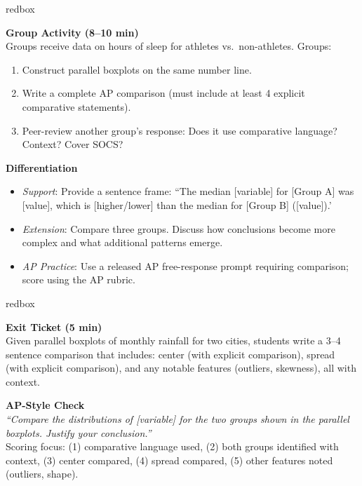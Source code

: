 \documentclass[10pt]{article}
\begin{document}
\boxguard
\begin{skillbox}{redbox}
\begin{minipage}[t]{0.48\linewidth}
    \textbf{Group Activity (8--10 min)}\\
    Groups receive data on hours of sleep for athletes vs.\ non-athletes. Groups:
    \begin{enumerate}
        \item Construct parallel boxplots on the same number line.
        \item Write a complete AP comparison (must include at least 4 explicit comparative statements).
        \item Peer-review another group's response: Does it use comparative language? Context? Cover SOCS?
    \end{enumerate}
\end{minipage}
\hfill
\begin{minipage}[t]{0.48\linewidth}
    \textbf{Differentiation}
    \begin{itemize}
        \item \textit{Support}: Provide a sentence frame: ``The median [variable] for [Group A] was [value], which is [higher/lower] than the median for [Group B] ([value]).'
        \item \textit{Extension}: Compare three groups. Discuss how conclusions become more complex and what additional patterns emerge.
        \item \textit{AP Practice}: Use a released AP free-response prompt requiring comparison; score using the AP rubric.
    \end{itemize}
\end{minipage}
\end{skillbox}

\boxguard
\begin{skillbox}{redbox}
\begin{minipage}[t]{0.48\linewidth}
    \textbf{Exit Ticket (5 min)}\\
    Given parallel boxplots of monthly rainfall for two cities, students write a 3--4 sentence comparison that includes: center (with explicit comparison), spread (with explicit comparison), and any notable features (outliers, skewness), all with context.
\end{minipage}
\hfill
\begin{minipage}[t]{0.48\linewidth}
    \textbf{AP-Style Check}\\
    \textit{``Compare the distributions of [variable] for the two groups shown in the parallel boxplots. Justify your conclusion.''}\\[4pt]
    Scoring focus: (1) comparative language used, (2) both groups identified with context, (3) center compared, (4) spread compared, (5) other features noted (outliers, shape).
\end{minipage}
\end{skillbox}
\end{document}
